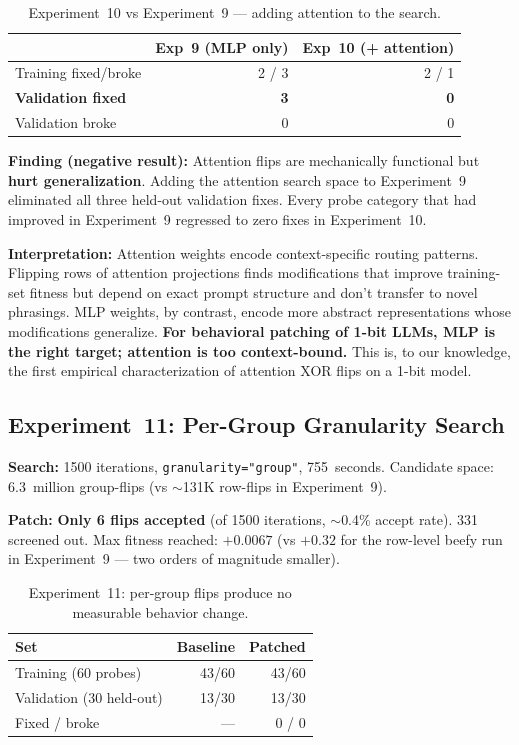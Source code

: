 \documentclass[11pt,a4paper]{article}
\begin{document}
\begin{table}[h]
\centering
\caption{Experiment~10 vs Experiment~9 --- adding attention to the search.}
\begin{tabular}{@{}lrr@{}}
\toprule
 & Exp~9 (MLP only) & Exp~10 (+ attention) \\
\midrule
Training fixed/broke & 2 / 3 & 2 / 1 \\
\textbf{Validation fixed} & \textbf{3} & \textbf{0} \\
Validation broke & 0 & 0 \\
\bottomrule
\end{tabular}
\end{table}

\textbf{Finding (negative result):} Attention flips are mechanically
functional but \textbf{hurt generalization}. Adding the attention
search space to Experiment~9 eliminated all three held-out validation
fixes. Every probe category that had improved in Experiment~9
regressed to zero fixes in Experiment~10.

\textbf{Interpretation:} Attention weights encode context-specific
routing patterns. Flipping rows of attention projections finds
modifications that improve training-set fitness but depend on exact
prompt structure and don't transfer to novel phrasings. MLP weights,
by contrast, encode more abstract representations whose modifications
generalize. \textbf{For behavioral patching of 1-bit LLMs, MLP is the
right target; attention is too context-bound.} This is, to our
knowledge, the first empirical characterization of attention XOR
flips on a 1-bit model.

\subsection{Experiment~11: Per-Group Granularity Search}

\textbf{Search:} 1500 iterations, \texttt{granularity="group"},
755~seconds. Candidate space: 6.3~million group-flips (vs $\sim$131K
row-flips in Experiment~9).

\textbf{Patch:} \textbf{Only 6 flips accepted} (of 1500 iterations,
$\sim$0.4\% accept rate). 331 screened out. Max fitness reached:
$+0.0067$ (vs $+0.32$ for the row-level beefy run in Experiment~9 ---
two orders of magnitude smaller).

\begin{table}[h]
\centering
\caption{Experiment~11: per-group flips produce no measurable behavior change.}
\begin{tabular}{@{}lrr@{}}
\toprule
Set & Baseline & Patched \\
\midrule
Training (60 probes) & 43/60 & 43/60 \\
Validation (30 held-out) & 13/30 & 13/30 \\
Fixed / broke & --- & 0 / 0 \\
\bottomrule
\end{tabular}
\end{table}
\end{document}
